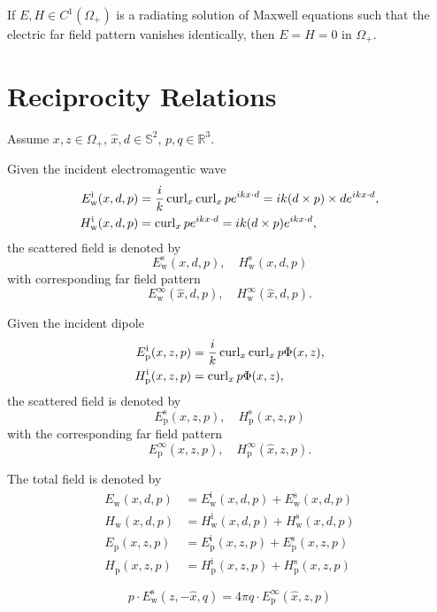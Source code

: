 \begin{prp}
  If $E, H\in C^1(\Omega_+)$ is a radiating solution of Maxwell equations such that the electric far field pattern vanishes identically, then $E=H=0$ in $\Omega_+$.
\end{prp}

\section{Reciprocity Relations}

Assume $x, z\in\Omega_+$, $\hat{x}, d\in\mathbb{S}^2$, $p, q\in\mathbb{R}^3$.  

Given the incident electromagentic wave 
\begin{align*}
  E_\text{w}^\text{i}(x, d, p) &= \frac{i}{k}\operatorname{curl}_x\operatorname{curl}_x p e^{ikx\cdot d} = ik(d\times p)\times d e^{ikx\cdot d}, \\
  H_\text{w}^\text{i}(x, d, p) &= \operatorname{curl}_x p e^{ikx\cdot d} = ik(d\times p)e^{ikx\cdot d}, 
\end{align*} 
the scattered field is denoted by 
$$E_\text{w}^\text{s}(x, d, p),\quad H_\text{w}^\text{s}(x, d, p)$$
with corresponding far field pattern
$$E_\text{w}^\infty(\hat{x}, d, p), \quad H_\text{w}^\infty(\hat{x}, d, p).$$

Given the incident dipole 
\begin{align*}
  E_\text{p}^\text{i}(x, z, p) &= \frac{i}{k}\operatorname{curl}_x\operatorname{curl}_x p\Phi(x, z), \\
  H_\text{p}^\text{i}(x, z, p) &= \operatorname{curl}_x p\Phi(x, z),
\end{align*}
the scattered field is denoted by 
$$E_\text{p}^\text{s}(x, z, p),\quad H_\text{p}^\text{s}(x, z, p)$$ 
with the corresponding far field pattern
$$E_\text{p}^\infty(\hat{x}, z, p),\quad H_\text{p}^\infty(\hat{x}, z, p).$$

The total field is denoted by 
\begin{align*}
  E_\text{w}(x, d, p) &= E_\text{w}^\text{i}(x, d, p) + E_\text{w}^\text{s}(x, d, p)\\
  H_\text{w}(x, d, p) &= H_\text{w}^\text{i}(x, d, p) + H_\text{w}^\text{s}(x, d, p) \\
  E_\text{p}(x, z, p) &= E_\text{p}^\text{i}(x, z, p) + E_\text{p}^\text{s}(x, z, p)\\
  H_\text{p}(x, z, p) &= H_\text{p}^\text{i}(x, z, p) + H_\text{p}^\text{s}(x, z, p)
\end{align*}

\begin{thm}
  $$p\cdot E_\text{w}^\text{s}(z, -\hat{x}, q) = 4\pi q\cdot E_\text{p}^\infty(\hat{x}, z, p)$$ 
\end{thm}


